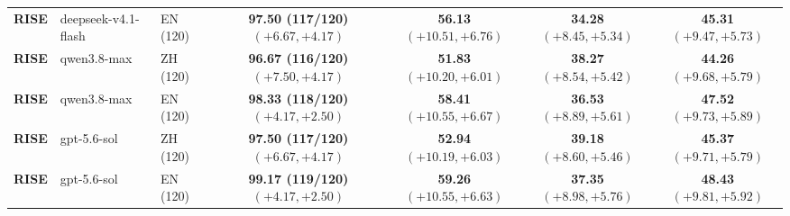 \documentclass{article}
\begin{document}
\begin{table}[!htb]
\begin{tabular*}{\linewidth}{@{\extracolsep{\fill}}lllcccc@{}}
\textbf{RISE} & deepseek-v4.1-flash & EN (120) & \shortstack[c]{\textbf{97.50 (117/120)}\\[-1pt]{\scriptsize $(+6.67,+4.17)$}} & \shortstack[c]{\textbf{56.13}\\[-1pt]{\scriptsize $(+10.51,+6.76)$}} & \shortstack[c]{\textbf{34.28}\\[-1pt]{\scriptsize $(+8.45,+5.34)$}} & \shortstack[c]{\textbf{45.31}\\[-1pt]{\scriptsize $(+9.47,+5.73)$}} \\
\textbf{RISE} & qwen3.8-max & ZH (120) & \shortstack[c]{\textbf{96.67 (116/120)}\\[-1pt]{\scriptsize $(+7.50,+4.17)$}} & \shortstack[c]{\textbf{51.83}\\[-1pt]{\scriptsize $(+10.20,+6.01)$}} & \shortstack[c]{\textbf{38.27}\\[-1pt]{\scriptsize $(+8.54,+5.42)$}} & \shortstack[c]{\textbf{44.26}\\[-1pt]{\scriptsize $(+9.68,+5.79)$}} \\
\textbf{RISE} & qwen3.8-max & EN (120) & \shortstack[c]{\textbf{98.33 (118/120)}\\[-1pt]{\scriptsize $(+4.17,+2.50)$}} & \shortstack[c]{\textbf{58.41}\\[-1pt]{\scriptsize $(+10.55,+6.67)$}} & \shortstack[c]{\textbf{36.53}\\[-1pt]{\scriptsize $(+8.89,+5.61)$}} & \shortstack[c]{\textbf{47.52}\\[-1pt]{\scriptsize $(+9.73,+5.89)$}} \\
\textbf{RISE} & gpt-5.6-sol & ZH (120) & \shortstack[c]{\textbf{97.50 (117/120)}\\[-1pt]{\scriptsize $(+6.67,+4.17)$}} & \shortstack[c]{\textbf{52.94}\\[-1pt]{\scriptsize $(+10.19,+6.03)$}} & \shortstack[c]{\textbf{39.18}\\[-1pt]{\scriptsize $(+8.60,+5.46)$}} & \shortstack[c]{\textbf{45.37}\\[-1pt]{\scriptsize $(+9.71,+5.79)$}} \\
\textbf{RISE} & gpt-5.6-sol & EN (120) & \shortstack[c]{\textbf{99.17 (119/120)}\\[-1pt]{\scriptsize $(+4.17,+2.50)$}} & \shortstack[c]{\textbf{59.26}\\[-1pt]{\scriptsize $(+10.55,+6.63)$}} & \shortstack[c]{\textbf{37.35}\\[-1pt]{\scriptsize $(+8.98,+5.76)$}} & \shortstack[c]{\textbf{48.43}\\[-1pt]{\scriptsize $(+9.81,+5.92)$}} \\
\bottomrule
\end{tabular*}
\end{table}
\end{document}
